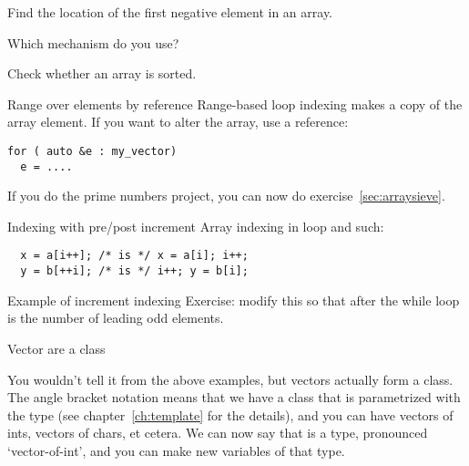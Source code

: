\begin{exercise}
  \label{ex:array-maxidx}
  Find the location of the first negative element in an array.

  Which mechanism do you use?
\end{exercise}

\begin{exercise}
  \label{ex:array-sorted}
  Check whether an array is sorted.
\end{exercise}

\begin{block}{Range over elements by reference}
  \label{sl:array-range-ref}
  Range-based loop indexing makes a copy of the array element. If you
  want to alter the array, use a reference:
\begin{lstlisting}
for ( auto &e : my_vector)
  e = ....
\end{lstlisting}
%
\end{block}

\begin{exercise}
  If you do the prime numbers project, you can now do exercise~\ref{sec:arraysieve}.
\end{exercise}

\begin{block}{Indexing with pre/post increment}
  \label{sl:prepostindex}
Array indexing in  loop and such:
\begin{lstlisting}
  x = a[i++]; /* is */ x = a[i]; i++;
  y = b[++i]; /* is */ i++; y = b[i];
\end{lstlisting}
\end{block}

\begin{block}{Example of increment indexing}
  Exercise: modify this so that after the while loop  is the
  number of leading odd elements.
\end{block}

 {Vector are a class}
\label{sec:stdvector}

You wouldn't tell it from the above examples, but vectors actually
form a  class. The angle bracket notation means
that we have a class that is parametrized with the type (see
chapter~\ref{ch:template} for the details), and you can
have vectors of ints, vectors of chars, et cetera. We can now say that
 is a type, pronounced `vector-of-int', and you can
make new variables of that type.

